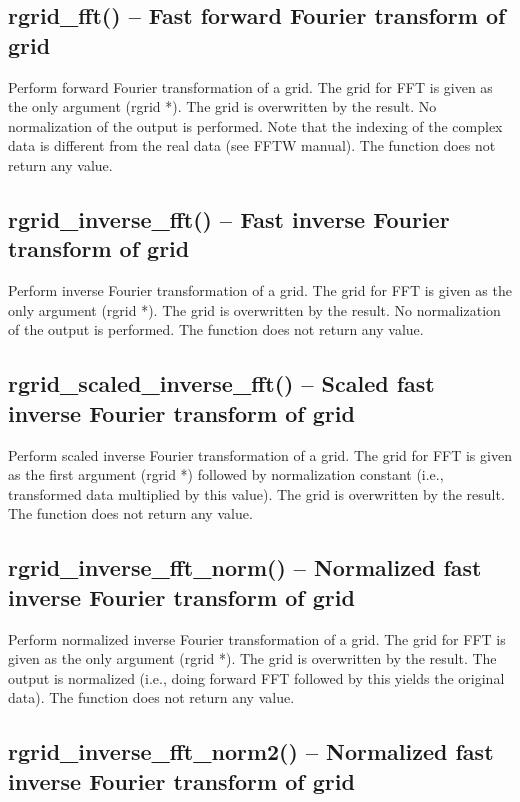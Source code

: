 \documentclass[12pt,letterpaper]{report}
\begin{document}
\subsection{rgrid\_fft() -- Fast forward Fourier transform of grid}

Perform forward Fourier transformation of a grid. The grid for FFT is given as the only argument (rgrid *). The grid is overwritten by the result. No normalization of the output is performed. Note that the indexing of the complex data is different from the real data (see FFTW manual). The function does not return any value. 

\subsection{rgrid\_inverse\_fft() -- Fast inverse Fourier transform of grid}

Perform inverse Fourier transformation of a grid. The grid for FFT is given as the only argument (rgrid *). The grid is overwritten by the result. No normalization of the output is performed. The function does not return any value.

\subsection{rgrid\_scaled\_inverse\_fft() -- Scaled fast inverse Fourier transform of grid}

Perform scaled inverse Fourier transformation of a grid. The grid for FFT is given as the first argument (rgrid *) followed by normalization constant (i.e., transformed data multiplied by this value). The grid is overwritten by the result. The function does not return any value.

\subsection{rgrid\_inverse\_fft\_norm() -- Normalized fast inverse Fourier transform of grid}

Perform normalized inverse Fourier transformation of a grid. The grid for FFT is given as the only argument (rgrid *). The grid is overwritten by the result. The output is normalized (i.e., doing forward FFT followed by this yields the original data). The function does not return any value.

\subsection{rgrid\_inverse\_fft\_norm2() -- Normalized fast inverse Fourier transform of grid}
\end{document}

